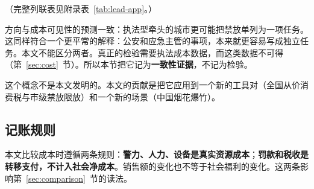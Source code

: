 （完整列联表见附录表~\ref{tab:lead-app}。）

方向与成本可见性的预测一致：执法型牵头的城市更可能把禁放单列为一项任务。这同样符合一个更平常的解释：公安和应急主管的事项，本来就更容易写成独立任务。本文不能区分两者。真正的检验需要执法成本数据，而这类数据不可得（第~\ref{sec:cost}~节）。所以本节把它记为\textbf{一致性证据}，不记为检验。

这个概念不是本文发明的。本文的贡献是把它应用到一个新的工具对（全国从价消费税与市级禁放限放）和一个新的场景（中国烟花爆竹）。

\subsection{记账规则}

本文比较成本时遵循两条规则：\textbf{警力、人力、设备是真实资源成本}；\textbf{罚款和税收是转移支付，不计入社会净成本}。销售额的变化也不等于社会福利的变化。这两条影响第~\ref{sec:comparison}~节的读法。
